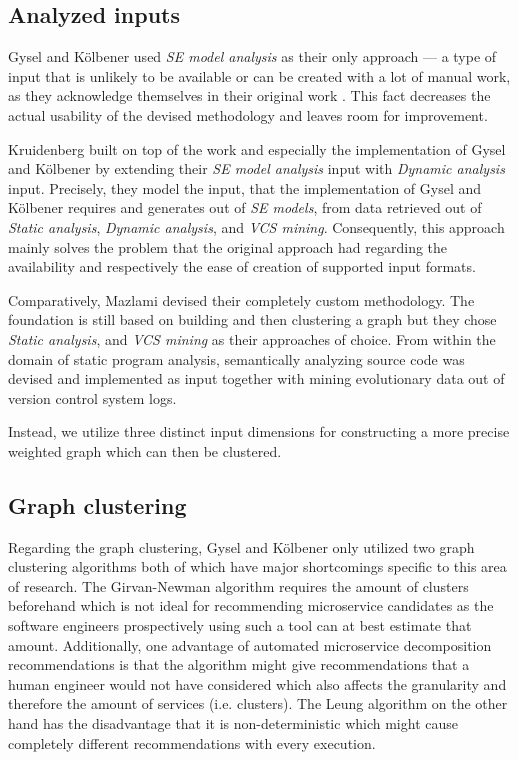 \documentclass[12pt,a4paper]{report}
\begin{document}
\subsection{Analyzed inputs}

Gysel and K{\"o}lbener used \textit{SE model analysis} as their only approach ---
a type of input that is unlikely to be available or
can be created with a lot of manual work, as they acknowledge
themselves in their original work \cite{gysel2016service}.
This fact decreases the actual usability of the devised methodology and leaves
room for improvement.

Kruidenberg \cite{kruidenberg2018monoliths} built on top of the work and
especially the implementation of Gysel and K{\"o}lbener by extending their
\textit{SE model analysis} input with \textit{Dynamic analysis} input.
Precisely, they model the input, that the implementation of Gysel and K{\"o}lbener
requires and generates out of \textit{SE models}, from data retrieved
out of \textit{Static analysis}, \textit{Dynamic analysis}, and \textit{VCS mining}.
Consequently, this approach mainly solves the problem that the original approach
had regarding the availability and respectively the ease of creation
of supported input formats.

Comparatively, Mazlami \cite{mazlami2017extraction} devised their completely
custom methodology. The foundation is still based on building and then clustering
a graph but they chose \textit{Static analysis}, and \textit{VCS mining} as
their approaches of choice. From within the domain of static program analysis,
semantically analyzing source code was devised and implemented as input together
with mining evolutionary data out of version control system logs.

Instead, we utilize three distinct input dimensions for constructing
a more precise weighted graph which can then be clustered.


\subsection{Graph clustering}

Regarding the graph clustering, Gysel and K{\"o}lbener \cite{gysel2016service}
only utilized two graph clustering algorithms both of which have major
shortcomings specific to this area of research.
The Girvan-Newman algorithm \cn requires the amount of clusters beforehand which
is not ideal for recommending microservice candidates as the software engineers
prospectively using such a tool can at best estimate that amount.
Additionally, one advantage of automated microservice decomposition recommendations
is that the algorithm might give recommendations that a human engineer would
not have considered which also affects the granularity and therefore the
amount of services (i.e. clusters).
The Leung algorithm \cn on the other hand has the disadvantage that it is
non-deterministic which might cause completely different recommendations with
every execution.
\end{document}
